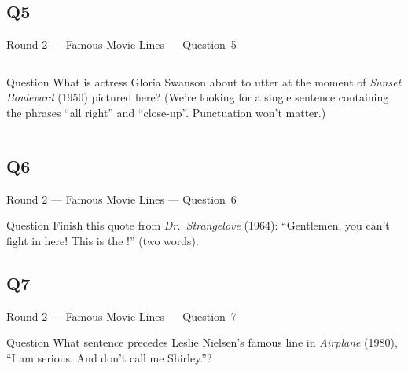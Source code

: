 \documentclass[11pt]{beamer}
\begin{document}
\subsection*{Q5}
\begin{frame}[t]{Round 2 --- Famous Movie Lines --- \mbox{Question 5}}
\vspace{-0.5em}
\begin{columns}[T,totalwidth=\linewidth]
\begin{column}{0.52\linewidth}
\begin{block}{Question}
What is actress Gloria Swanson about to utter at the moment of \emph{Sunset Boulevard} (1950) pictured here? (We're looking for a single sentence containing the phrases ``all right'' and ``close-up''. Punctuation won't matter.)
\end{block}
\end{column}
\begin{column}{0.45\linewidth}
\begin{center}
\texttt{[image: \{Images/demille]}.jpg}
\end{center}
\end{column}
\end{columns}
\end{frame}
\subsection*{Q6}
\begin{frame}[t]{Round 2 --- Famous Movie Lines --- \mbox{Question 6}}
\vspace{-0.5em}
\begin{block}{Question}
Finish this quote from \emph{Dr.\ Strangelove} (1964): ``Gentlemen, you can't fight in here! This is the \textunderscore{}\textunderscore{}\textunderscore{}\textunderscore{}\textunderscore{} \textunderscore{}\textunderscore{}\textunderscore{}\textunderscore{}\textunderscore{}!'' (two words).
\end{block}
\end{frame}
\subsection*{Q7}
\begin{frame}[t]{Round 2 --- Famous Movie Lines --- \mbox{Question 7}}
\vspace{-0.5em}
\begin{block}{Question}
What sentence precedes Leslie Nielsen's famous line in \emph{Airplane} (1980), ``I am serious. And don't call me Shirley.''?
\end{block}
\end{frame}
\end{document}
